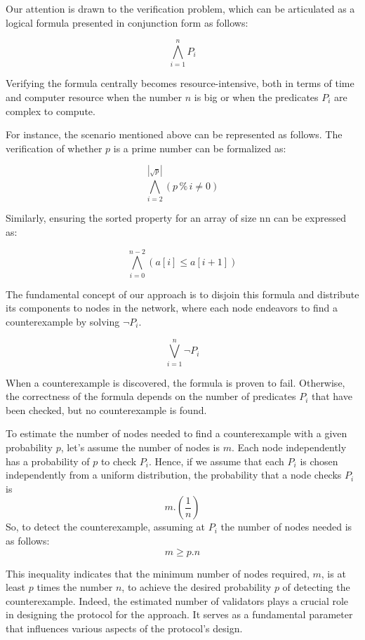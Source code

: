 \documentclass[runningheads]{llncs}
\begin{document}
Our attention is drawn to the verification problem, which can be articulated as a logical formula presented in conjunction form as follows:

\[ \bigwedge_{i = 1}^{n} P_{i} \]

Verifying the formula centrally becomes resource-intensive, both in terms of time and computer resource when the number $n$ is big or when the predicates $P_{i}$ are complex to compute. 


For instance, the scenario mentioned above can be represented as follows. The verification of whether $p$ is a prime number can be formalized as:

\[ \bigwedge_{i = 2}^{|\sqrt p|} (p \mathbin{\%} i \neq 0) \]

Similarly, ensuring the sorted property for an array of size nn can be expressed as:

\[ \bigwedge_{i = 0}^{n - 2} (a[i] \le a[i+1]) \]

The fundamental concept of our approach is to disjoin this formula and distribute its components to nodes in the network, where each node endeavors to find a counterexample by solving $\neg P_{i}$. 

\begin{displaymath}
\bigvee_{i = 1}^{n} \neg P_{i}
\end{displaymath}

When a counterexample is discovered, the formula is proven to fail. Otherwise, the correctness of the formula depends on the number of predicates  $P_{i}$ that have been checked, but no counterexample is found. 

To estimate the number of nodes needed to find a counterexample with a given probability $p$, let's assume the number of nodes is $m$. Each node independently has a probability of $p$ to check $P_{i}$. Hence, if we assume that each $P_{i}$ is chosen independently from a uniform distribution, the probability that a node checks $P_{i}$ is 
\begin{displaymath}
 m. (\frac{1}{n})
\end{displaymath}
So, to detect the counterexample, assuming at $P_{i}$ the number of nodes needed is as follows:
\begin{displaymath}
 m \ge p.n
\end{displaymath}

This inequality indicates that the minimum number of nodes required, $m$, is at least $p$ times the number $n$, to achieve the desired probability $p$ of detecting the counterexample. Indeed, the estimated number of validators plays a crucial role in designing the protocol for the approach. It serves as a fundamental parameter that influences various aspects of the protocol's design.
\end{document}
